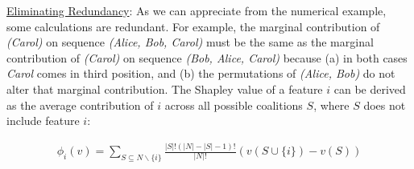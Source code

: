 \iffalse
\begin{tabular}{l|l|l|l}
\multicolumn{1}{c|} { Sequence } & \multicolumn{1}{c|} {$x^{(1)}$} & \multicolumn{1}{c} {$x^{(2)}$} & \multicolumn{1}{c} {$x^{(3)}$} \\
\hline$x^{(1)}, x^{(2)}, x^{(3)}$ & $f[x \mid 100]$ & $f[x \mid 110]$ & $f[x \mid 111]$ \\
& $-f[x \mid 000]$ & $-f[x \mid 100]$ & $-f[x \mid 110]$ \\
\hline$x^{(1)}, x^{(3)}, x^{(2)}$ & $f[x \mid 100]$ & $f[x \mid 111]$ & $f[x \mid 101]$ \\
& $-f[x \mid 000]$ & $-f[x \mid 101]$ & $-f[x \mid 100]$ \\
\hline$x^{(2)}, x^{(1)}, x^{(3)}$ & $f[x \mid 110]$ & $f[x \mid 010]$ & $f[x \mid 111]$ \\
& $-f[x \mid 010]$ & $-f[x \mid 000]$ & $-f[x \mid 110]$ \\
\hline$x^{(2)}, x^{(3)}, x^{(1)}$ & $f[x \mid 111]$ & $f[x \mid 010]$ & $f[x \mid 011]$ \\
& $-f[x \mid 011]$ & $-f[x \mid 000]$ & $-f[x \mid 010]$ \\
\hline$x^{(3)}, x^{(1)}, x^{(2)}$ & $f[x \mid 101]$ & $f[x \mid 111]$ & $f[x \mid 001]$ \\
& $-f[x \mid 001]$ & $-f[x \mid 101]$ & $-f[x \mid 000]$ \\
\hline$x^{(3)}, x^{(2)}, x^{(1)}$ & $f[x \mid 111]$ & $f[x \mid 011]$ & $f[x \mid 001]$ \\
& $-f[x \mid 011]$ & $-f[x \mid 001]$ & $-f[x \mid 000]$
\end{tabular}
\fi

\underline{Eliminating Redundancy}: As we can appreciate from the numerical example, some calculations are redundant. For example, the marginal contribution of \emph{(Carol)} on sequence \emph{(Alice, Bob, Carol)} must be the same as the marginal contribution of \emph{(Carol)} on sequence \emph{(Bob, Alice, Carol)} because (a) in both cases \emph{Carol} comes in third position, and (b) the permutations of \emph{(Alice, Bob)} do not alter that marginal contribution. The Shapley value of a feature $i$ can be derived as the average contribution of $i$ across all possible coalitions $S$, where $S$ does not include feature $i$:

\begin{align}\label{eq:shapley_main}
    \phi_{i}(v)=\sum_{S \subseteq N \backslash\{i\}} \frac{|S| !(|N|-|S|-1) !}{|N| !}(v(S \cup\{i\})-v(S))
\end{align}

